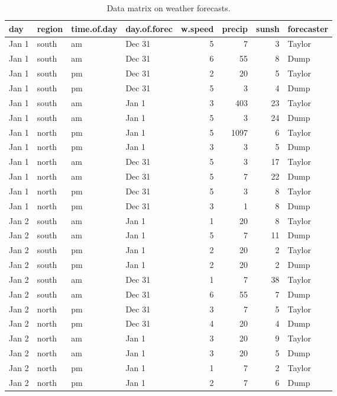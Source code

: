 \documentclass[]{report}\usepackage[]{graphicx}\usepackage[]{color}
\begin{document}
\begin{table}[ht]
\centering
\caption{Data matrix on weather forecasts.} 
\label{tab:data_5c}
\begin{tabular}{llllrrrl}
  \hline
day & region & time.of.day & day.of.forec & w.speed & precip & sunsh & forecaster \\ 
  \hline
Jan 1 & south & am & Dec 31 & 5 & 7 & 3 & Taylor \\ 
  Jan 1 & south & am & Dec 31 & 6 & 55 & 8 & Dump \\ 
  Jan 1 & south & pm & Dec 31 & 2 & 20 & 5 & Taylor \\ 
  Jan 1 & south & pm & Dec 31 & 5 & 3 & 4 & Dump \\ 
  Jan 1 & south & am & Jan 1 & 3 & 403 & 23 & Taylor \\ 
  Jan 1 & south & am & Jan 1 & 5 & 3 & 24 & Dump \\ 
  Jan 1 & north & pm & Jan 1 & 5 & 1097 & 6 & Taylor \\ 
  Jan 1 & north & pm & Jan 1 & 3 & 3 & 5 & Dump \\ 
  Jan 1 & north & am & Dec 31 & 5 & 3 & 17 & Taylor \\ 
  Jan 1 & north & am & Dec 31 & 5 & 7 & 22 & Dump \\ 
  Jan 1 & north & pm & Dec 31 & 5 & 3 & 8 & Taylor \\ 
  Jan 1 & north & pm & Dec 31 & 3 & 1 & 8 & Dump \\ 
  Jan 2 & south & am & Jan 1 & 1 & 20 & 8 & Taylor \\ 
  Jan 2 & south & am & Jan 1 & 5 & 7 & 11 & Dump \\ 
  Jan 2 & south & pm & Jan 1 & 2 & 20 & 2 & Taylor \\ 
  Jan 2 & south & pm & Jan 1 & 2 & 20 & 2 & Dump \\ 
  Jan 2 & south & am & Dec 31 & 1 & 7 & 38 & Taylor \\ 
  Jan 2 & south & am & Dec 31 & 6 & 55 & 7 & Dump \\ 
  Jan 2 & north & pm & Dec 31 & 3 & 7 & 5 & Taylor \\ 
  Jan 2 & north & pm & Dec 31 & 4 & 20 & 4 & Dump \\ 
  Jan 2 & north & am & Jan 1 & 3 & 20 & 9 & Taylor \\ 
  Jan 2 & north & am & Jan 1 & 3 & 20 & 5 & Dump \\ 
  Jan 2 & north & pm & Jan 1 & 1 & 7 & 2 & Taylor \\ 
  Jan 2 & north & pm & Jan 1 & 2 & 7 & 6 & Dump \\ 
   \hline
\end{tabular}
\end{table}
\end{document}
